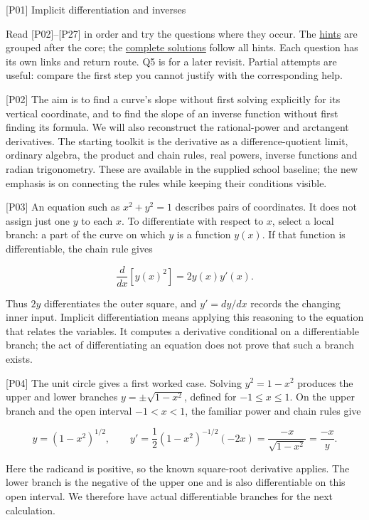 \documentclass[
  11pt,
]{article}
\author{}
\date{}
\providecommand{\lt}{<}
\begin{document}
{[}P01{]} Implicit differentiation and inverses

Read {[}P02{]}--{[}P27{]} in order and try the questions where they
occur. The \protect\hyperlink{hints}{hints} are grouped after the core;
the \protect\hyperlink{solutions}{complete solutions} follow all hints.
Each question has its own links and return route. Q5 is for a later
revisit. Partial attempts are useful: compare the first step you cannot
justify with the corresponding help.

{[}P02{]} The aim is to find a curve's slope without first solving
explicitly for its vertical coordinate, and to find the slope of an
inverse function without first finding its formula. We will also
reconstruct the rational-power and arctangent derivatives. The starting
toolkit is the derivative as a difference-quotient limit, ordinary
algebra, the product and chain rules, real powers, inverse functions and
radian trigonometry. These are available in the supplied school
baseline; the new emphasis is on connecting the rules while keeping
their conditions visible.

{[}P03{]} An equation such as \(x^2+y^2=1\) describes pairs of
coordinates. It does not assign just one \(y\) to each \(x\). To
differentiate with respect to \(x\), select a local branch: a part of
the curve on which \(y\) is a function \(y(x)\). If that function is
differentiable, the chain rule gives

\[
\frac{d}{dx}[y(x)^2]=2y(x)y'(x).
\]

Thus \(2y\) differentiates the outer square, and \(y'=dy/dx\) records
the changing inner input. Implicit differentiation means applying this
reasoning to the equation that relates the variables. It computes a
derivative conditional on a differentiable branch; the act of
differentiating an equation does not prove that such a branch exists.

{[}P04{]} The unit circle gives a first worked case. Solving
\(y^2=1-x^2\) produces the upper and lower branches
\(y=\pm\sqrt{1-x^2}\), defined for \(-1\leq x\leq1\). On the upper
branch and the open interval \(-1\lt x\lt 1\), the familiar power and
chain rules give

\[
y=(1-x^2)^{1/2},\qquad
y'=\frac12(1-x^2)^{-1/2}(-2x)
   =\frac{-x}{\sqrt{1-x^2}}=\frac{-x}{y}.
\]

Here the radicand is positive, so the known square-root derivative
applies. The lower branch is the negative of the upper one and is also
differentiable on this open interval. We therefore have actual
differentiable branches for the next calculation.
\end{document}
